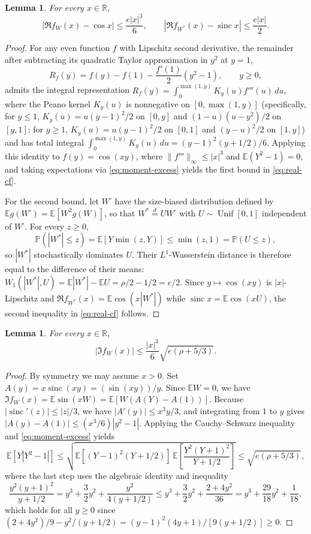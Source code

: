 \documentclass[11pt]{article}
\numberwithin{equation}{section}
\newtheorem{lemma}[theorem]{Lemma}
\theoremstyle{remark}
\DeclareMathOperator{\sinc}{sinc}
\DeclareMathOperator{\Unif}{Unif}
\newcommand{\E}{\mathbb E}
\newcommand{\Prob}{\mathbb P}
\newcommand{\R}{\mathbb R}
\begin{document}
\begin{lemma}\label{lem:peano}
For every $x\in\R$,
\begin{equation}\label{eq:real-cf}
 |\Re f_W(x)-\cos x|\le \frac{e|x|^3}{6},
 \qquad
 |\Re f_{W^*}(x)-\sinc x|\le \frac{e|x|}{2}.
\end{equation}
\end{lemma}
\begin{proof}
For any even function $f$ with Lipschitz second derivative, the remainder
after subtracting its quadratic Taylor approximation in $y^2$ at $y=1$,
\[
 R_f(y)=f(y)-f(1)-\frac{f'(1)}2(y^2-1),\qquad y\ge0,
\]
admits the integral representation $R_f(y)=\int_0^{\max(1,y)}K_y(u)f'''(u)\,du$,
where the Peano kernel $K_y(u)$ is nonnegative on $[0,\max(1,y)]$ (specifically,
for $y\le1$, $K_y(u)=u(y-1)^2/2$ on $[0,y]$ and $(1-u)(u-y^2)/2$ on $[y,1]$;
for $y\ge1$, $K_y(u)=u(y-1)^2/2$ on $[0,1]$ and $(y-u)^2/2$ on $[1,y]$) and
has total integral $\int_0^{\max(1,y)}K_y(u)\,du=(y-1)^2(y+1/2)/6$. Applying
this identity to $f(y)=\cos(xy)$, where $\|f'''\|_\infty\le|x|^3$ and
$\E(Y^2-1)=0$, and taking expectations via \eqref{eq:moment-excess} yields
the first bound in \eqref{eq:real-cf}.

For the second bound, let $W^\square$ have the size-biased distribution
defined by $\E g(W^\square)=\E[W^2g(W)]$, so that $W^*\stackrel d=UW^\square$
with $U\sim\Unif[0,1]$ independent of $W^\square$. For every $z\ge0$,
\[
 \Prob(|W^*|\le z)=\E[Y\min(z,Y)]\le\min(z,1)=\Prob(U\le z),
\]
so $|W^*|$ stochastically dominates $U$. Their $L^1$-Wasserstein distance
is therefore equal to the difference of their means:
$W_1(|W^*|,U)=\E|W^*|-\E U=\rho/2-1/2=e/2$. Since $y\mapsto\cos(xy)$ is
$|x|$-Lipschitz and $\Re f_{W^*}(x)=\E\cos(x|W^*|)$ while $\sinc x=\E\cos(xU)$,
the second inequality in \eqref{eq:real-cf} follows.
\end{proof}

\begin{lemma}\label{lem:imaginary}
For every $x\in\R$,
\begin{equation}\label{eq:imaginary-cf}
 |\Im f_W(x)|\le \frac{|x|^3}{6}\sqrt{e(\rho+5/3)}.
\end{equation}
\end{lemma}
\begin{proof}
By symmetry we may assume $x>0$. Set $A(y)=x\sinc(xy)=(\sin(xy))/y$. Since
$\E W=0$, we have $\Im f_W(x)=\E\sin(xW)=\E[W(A(Y)-A(1))]$. Because
$|\sinc'(z)|\le|z|/3$, we have $|A'(y)|\le x^3y/3$, and integrating from $1$
to $y$ gives $|A(y)-A(1)|\le(x^3/6)|y^2-1|$. Applying the Cauchy--Schwarz
inequality and \eqref{eq:moment-excess} yields
\[
 \E[Y|Y^2-1|]\le
 \sqrt{\E[(Y-1)^2(Y+1/2)]\,\E\!\left[\frac{Y^2(Y+1)^2}{Y+1/2}\right]}
 \le\sqrt{e(\rho+5/3)},
\]
where the last step uses the algebraic identity and inequality
\[
 \frac{y^2(y+1)^2}{y+1/2}=y^3+\frac32y^2+\frac{y^2}{4(y+1/2)}
 \le y^3+\frac32y^2+\frac{2+4y^2}{36}=y^3+\frac{29}{18}y^2+\frac1{18},
\]
which holds for all $y\ge0$ since
$(2+4y^2)/9-y^2/(y+1/2)=(y-1)^2(4y+1)/[9(y+1/2)]\ge0$.
\end{proof}
\end{document}

